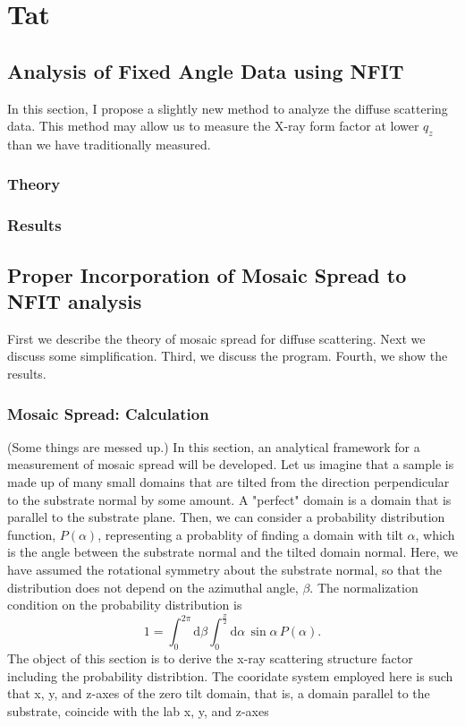 \chapter{Tat}
\section{Analysis of Fixed Angle Data using NFIT}\label{sec:fixed_angle_analysis}
In this section, I propose a slightly new method to analyze the diffuse 
scattering data. This method may allow us to measure the X-ray form factor
at lower $q_z$ than we have traditionally measured. 

\subsection{Theory}

\subsection{Results}

\section{Proper Incorporation of Mosaic Spread to NFIT analysis}
\label{sec:mosaic_spread}
First we describe the theory of mosaic spread for diffuse scattering. 
Next we discuss some simplification. Third, we discuss the program.
Fourth, we show the results.

\subsection{Mosaic Spread: Calculation}
(Some things are messed up.)
In this section, an analytical framework for a measurement of mosaic spread will 
be developed. Let us imagine that a sample is made up of many small domains 
that are 
tilted from the direction perpendicular to the substrate normal by some amount. 
A "perfect" domain is a domain that is parallel to the substrate plane.
Then, we can consider a probability distribution function, $P(\alpha)$, 
representing a probablity of finding a domain with tilt $\alpha$, which is the 
angle
between the substrate normal and the tilted domain normal. Here, we have
assumed the rotational symmetry about the substrate normal, so that the 
distribution
does not depend on the azimuthal angle, $\beta$. The normalization condition on 
the probability distribution is 
\begin{equation}
  1 = \int_0^{2\pi} \!\! \mathrm{d}\beta  
      \int_0^{\frac{\pi}{2}} \! \mathrm{d}\alpha \, \sin\alpha \, P(\alpha).
\end{equation}
The object of this section is to derive the x-ray scattering structure factor 
including the probability distribtion. The cooridate system employed here is 
such that x, y, and
z-axes of the zero tilt domain, that is, a domain parallel to the substrate, 
coincide with the lab x, y, and z-axes 

